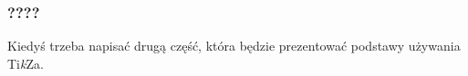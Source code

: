 \documentclass[10pt,t]{beamer}
\begin{document}
\begin{frame}
  \frametitle{????}


  Kiedyś trzeba napisać drugą część, która będzie prezentować podstawy
  używania Ti\textit{k}Za.

\end{frame}










\appendix
















\end{document}
